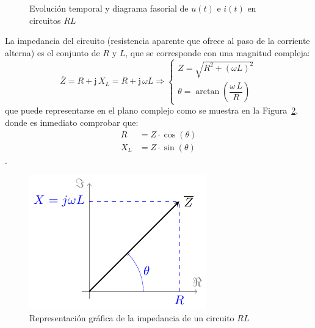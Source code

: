 \documentclass[11pt]{book} %
\begin{document}
	\begin{figure}[htbp]
		\centering
		\hfil
		\caption{Evolución temporal y diagrama fasorial de $u(t)$ e $i(t)$ en circuitos $RL$}
		\label{fig.fasorInductanciaReal_VI}
	\end{figure}
	
	La impedancia del circuito (resistencia aparente que ofrece al paso de la corriente alterna) es el conjunto de $R$ y $L$, que se corresponde con una magnitud compleja: 
	\begin{equation}
		\boxed{ \overline{Z} = R + \mathrm{j}\,X_L = R+ \mathrm{j}\,\omega L \Rightarrow 
			\begin{cases}
				Z=\sqrt{R^2+(\omega L)^2}\\
				\theta=\arctan\left(\dfrac{\omega\,L}{R} \right)
		\end{cases}}
	\end{equation}
	que puede representarse en el plano complejo como se muestra en la Figura~\ref{fig.fasorinductanciareal}, donde es inmediato comprobar que:
	\begin{align*}
		R&=Z\cdot\cos(\theta)\\
		X_L&=Z\cdot\sin(\theta)
	\end{align*}. 
	\begin{figure}[htbp]
		\centering
		\includegraphics{../figs/fasorInductanciaReal.pdf}
		\caption{Representación gráfica de la impedancia de un circuito $RL$}
		\label{fig.fasorinductanciareal}
	\end{figure}
	
\end{document}
